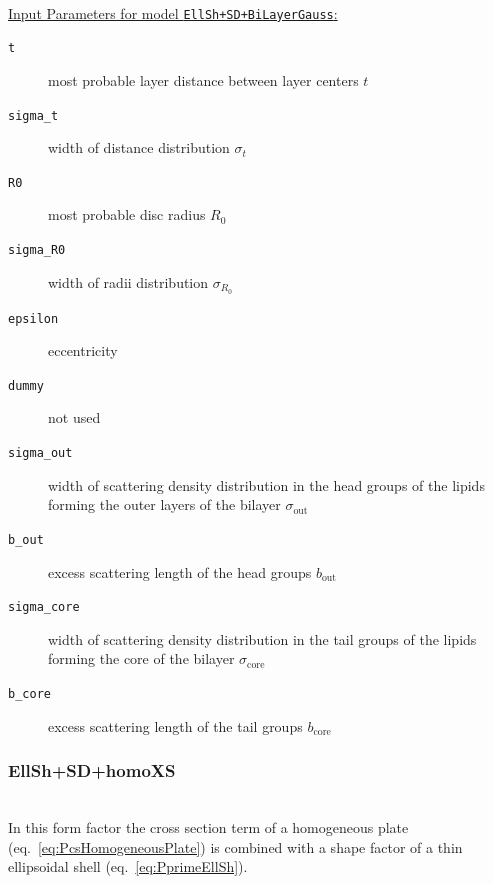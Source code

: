 \hspace{1pt}\\
\underline{Input Parameters for model \texttt{EllSh+SD+BiLayerGauss}:}\\
\begin{description}
\item[\texttt{t}] most probable layer distance between layer centers $t$
\item[\texttt{sigma\_t}] width of distance distribution $\sigma_t$
\item[\texttt{R0}] most probable disc radius $R_0$
\item[\texttt{sigma\_R0}] width of radii distribution $\sigma_{R_0}$
\item[\texttt{epsilon}] eccentricity
\item[\texttt{dummy}] not used
\item[\texttt{sigma\_out}] width of scattering density distribution in the head groups of the lipids forming the outer layers of the bilayer $\sigma_\mathrm{out}$
\item[\texttt{b\_out}] excess scattering length of the head groups $b_\mathrm{out}$
\item[\texttt{sigma\_core}] width of scattering density distribution in the tail groups of the lipids forming the core of the bilayer $\sigma_\mathrm{core}$
\item[\texttt{b\_core}] excess scattering length of the tail groups $b_\mathrm{core}$
\end{description}

\vspace{5mm}

\noindent
\subsubsection{EllSh+SD+homoXS} ~\\

\noindent
In this form factor the cross section term of a homogeneous plate (eq.\ \ref{eq:PcsHomogeneousPlate}) is combined with a shape factor of a thin ellipsoidal shell (eq.\ \ref{eq:PprimeEllSh}).

\vspace{5mm}

